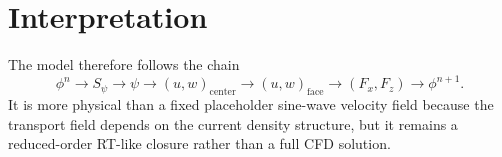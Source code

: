 \documentclass[10pt,twocolumn]{article}
\begin{document}
\section*{Interpretation}
The model therefore follows the chain
\[
\phi^n \rightarrow S_\psi \rightarrow \psi \rightarrow (u,w)_{\text{center}}
\rightarrow (u,w)_{\text{face}} \rightarrow (F_x,F_z) \rightarrow \phi^{n+1}.
\]
It is more physical than a fixed placeholder sine-wave velocity field because
the transport field depends on the current density structure, but it remains a
reduced-order RT-like closure rather than a full CFD solution.
\end{document}
